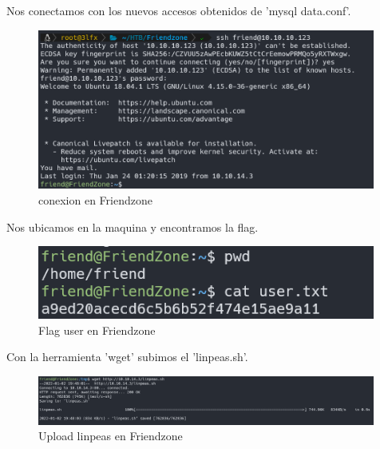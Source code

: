         \large{Nos conectamos con los nuevos accesos obtenidos de 'mysql data.conf'.}
        \par
        \begin{figure}[H]
            \centering
            \includegraphics[width=0.99\textwidth]{informe4/imagenes/friendzone/22_conexionfriend.png}
            \caption{conexion en Friendzone} 
        \end{figure}

        \large{Nos ubicamos en la maquina y encontramos la flag.}
        \par
        \begin{figure}[H]
            \centering
            \includegraphics[width=0.99\textwidth]{informe4/imagenes/friendzone/23_1_flag_user.png}
            \caption{Flag user en Friendzone} 
        \end{figure}

        \large{Con la herramienta 'wget' subimos el 'linpeas.sh'.}
        \par
        \begin{figure}[H]
            \centering
            \includegraphics[width=0.99\textwidth]{informe4/imagenes/friendzone/23_2_uploadlinpeas.png}
            \caption{Upload linpeas en Friendzone} 
        \end{figure}

